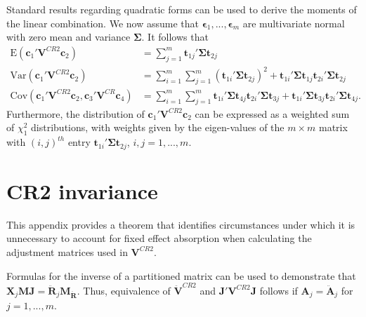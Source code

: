 \documentclass[12pt]{article}
\newcommand{\E}{\text{E}}
\newcommand{\Cov}{\text{Cov}}
\newcommand{\Var}{\text{Var}}
\newcommand{\bm}{\mathbf}
\newcommand{\bs}{\boldsymbol}
\begin{document}
Standard results regarding quadratic forms can be used to derive the moments of the linear combination. We now assume that $\bs\epsilon_1,...,\bs\epsilon_m$ are multivariate normal with zero mean and variance $\bs\Sigma$. It follows that 
\begin{align}
\label{eq:CRVE_expectation}
\E\left(\bm{c}_1' \bm{V}^{CR2} \bm{c}_2\right) &= \sum_{j=1}^m \bm{t}_{1j}' \bs\Sigma \bm{t}_{2j} \\
\label{eq:CRVE_variance}
\Var\left(\bm{c}_1' \bm{V}^{CR2} \bm{c}_2\right) &= \sum_{i=1}^m \sum_{j=1}^m \left(\bm{t}_{1i}' \bs\Sigma \bm{t}_{2j}\right)^2 + \bm{t}_{1i}' \bs\Sigma \bm{t}_{1j} \bm{t}_{2i}' \bs\Sigma \bm{t}_{2j} \\
\label{eq:CRVE_covariance}
\Cov\left(\bm{c}_1' \bm{V}^{CR2} \bm{c}_2, \bm{c}_3' \bm{V}^{CR} \bm{c}_4\right) &= \sum_{i=1}^m \sum_{j=1}^m \bm{t}_{1i}' \bs\Sigma \bm{t}_{4j} \bm{t}_{2i}' \bs\Sigma \bm{t}_{3j} + \bm{t}_{1i}' \bs\Sigma \bm{t}_{3j} \bm{t}_{2i}' \bs\Sigma \bm{t}_{4j}.
\end{align}
Furthermore, the distribution of $\bm{c}_1' \bm{V}^{CR2} \bm{c}_2$ can be expressed as a weighted sum of $\chi^2_1$ distributions, with weights given by the eigen-values of the $m \times m$ matrix with $\left(i,j\right)^{th}$ entry $\bm{t}_{1i}' \bs\Sigma \bm{t}_{2j}$, $i,j=1,...,m$.


\section{CR2 invariance}
\label{app:theorem1}

This appendix provides a theorem that identifies circumstances under which it is unnecessary to account for fixed effect absorption when calculating the adjustment matrices used in $\bm{V}^{CR2}$. 

Formulas for the inverse of a partitioned matrix can be used to demonstrate that $\bm{X}_j\bm{M}\bm{J} = \bm{\ddot{R}}_j \bm{M_{\ddot{R}}}$. Thus, equivalence of $\bm{\ddot{V}}^{CR2}$ and $\bm{J}'\bm{V}^{CR2}\bm{J}$ follows if $\bm{A}_j = \bm{\ddot{A}}_j$ for $j = 1,...,m$.
\end{document}
